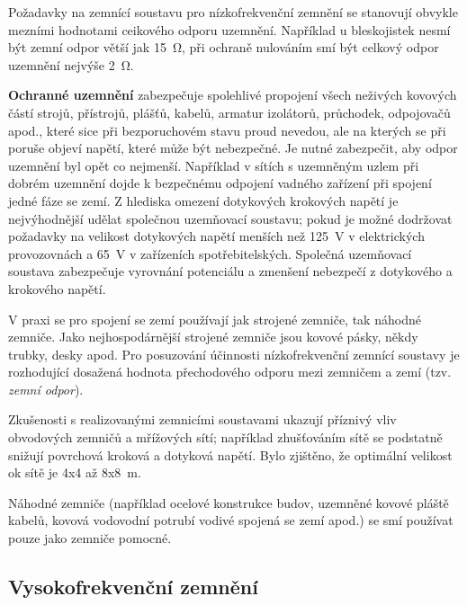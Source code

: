       Požadavky na zemnící soustavu pro nízkofrekvenční zemnění se stanovují obvykle mezními
      hodnotami ceikového odporu uzemnění. Například u bleskojistek nesmí být zemní odpor větší jak
      \SI{15}{\ohm}, při ochraně nulováním smí být celkový odpor uzemnění nejvýše \SI{2}{\ohm}. 

      \textbf{Ochranné uzemnění} zabezpečuje spolehlivé propojení všech neživých kovových částí
      strojů, přístrojů, plášťů, kabelů, armatur izolátorů, průchodek, odpojovačů apod., které sice
      při bezporuchovém stavu proud nevedou, ale na kterých se při poruše objeví napětí, které může
      být nebezpečné. Je nutné zabezpečit, aby odpor uzemnění byl opět co nejmenší. Například v
      sítích s uzemněným uzlem při dobrém uzemnění dojde k bezpečnému odpojení vadného zařízení při
      spojení jedné fáze se zemí. Z hlediska omezení dotykových krokových napětí je nejvýhodnější
      udělat společnou uzemňovací soustavu; pokud je možné dodržovat požadavky na velikost
      dotykových napětí menších než \SI{125}{\V} v elektrických provozovnách a \SI{65}{\V} v
      zařízeních spotřebitelských. Společná uzemňovací soustava zabezpečuje vyrovnání potenciálu a
      zmenšení nebezpečí z dotykového a krokového napětí. 

      V praxi se pro spojení se zemí používají jak strojené zemniče, tak náhodné zemniče. Jako
      nejhospodárnější strojené zemniče jsou kovové pásky, někdy trubky, desky apod. Pro posuzování
      účinnosti nízkofrekvenční zemnící soustavy je rozhodující dosažená hodnota přechodového odporu
      mezi zemničem a zemí (tzv. \emph{zemní odpor}). 

      Zkušenosti s realizovanými zemnicími soustavami ukazují příznivý vliv obvodových zemničů a
      mřížových sítí; například zhušťováním sítě se podstatně snižují povrchová kroková a dotyková
      napětí. Bylo zjištěno, že optimální velikost ok sítě je 4x4 až 8x\SI{8}{\m}. 

      Náhodné zemniče (například ocelové konstrukce budov, uzemněné kovové pláště kabelů, kovová
      vodovodní potrubí vodivé spojená se zemí apod.) se smí používat pouze jako zemniče pomocné. 

    \subsection{Vysokofrekvenční zemnění}\label{emc:IchapIIIsecIssecI}
